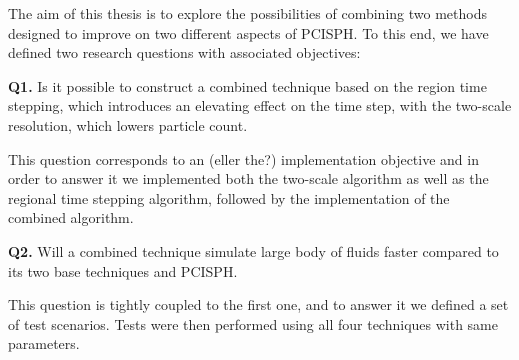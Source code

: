 \documentclass[../../main.tex]{subfiles}
\begin{document}

The aim of this thesis is to explore the possibilities of combining two methods designed to improve on two different aspects of PCISPH. To this end, we have defined two research questions with associated objectives: 

\begin{displayquote}
{\large \textbf{Q1.}} 
Is it possible to construct a combined technique based on the region time stepping, which introduces an elevating effect on the time step, with the two-scale resolution, which lowers particle count.
\end{displayquote} 

This question corresponds to an (eller the?) implementation objective and in order to answer it we implemented both the two-scale algorithm as well as the regional time stepping algorithm, followed by the implementation of the combined algorithm. 

\begin{displayquote}
{\large \textbf{Q2.}} Will a combined technique simulate large body of fluids faster compared to its two base techniques and PCISPH.
\end{displayquote}

This question is tightly coupled to the first one, and to answer it we defined a set of test scenarios. Tests were then performed using all four techniques with same parameters. 
\end{document}
